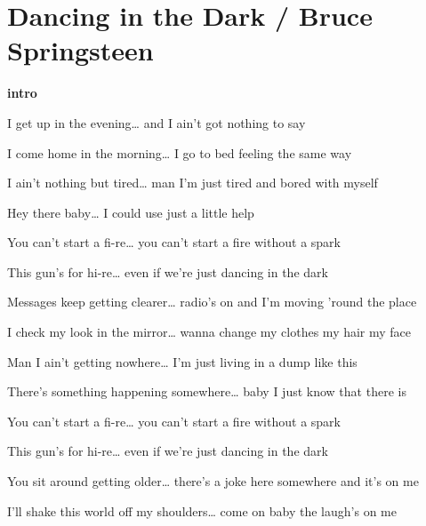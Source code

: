 \section{Dancing in the Dark / Bruce Springsteen}\label{sec:dancinginthedark}

\Gmajor
\Eminor
\Cmajor
\Aminor
\DmajorEasy

\textbf{intro}    

 I get up in the evening…  and I ain’t got nothing to say

I come home in the morning…  I go to bed feeling the same
way

I ain't nothing but tired…  man I'm just tired and bored with
myself

Hey there baby…  I could use just a little help

You can't start a fi-re… you can't start a fire without a spark

This gun's for hi-re…  even if we're just dancing in the dark

  

 Messages keep getting clearer…  radio's on and I'm moving
'round the place

I check my look in the mirror…  wanna change my clothes my hair
my face

Man I ain't getting nowhere…  I'm just living in a dump like
this

There's something happening somewhere…  baby I just know that
there is

You can't start a fi-re… you can't start a fire without a spark

This gun's for hi-re…  even if we're just dancing in the dark
  

 You sit around getting older…  there's a joke here somewhere
and it's on me

I'll shake this world off my shoulders…  come on baby the laugh's on
me

